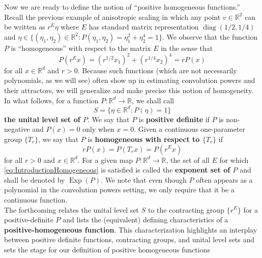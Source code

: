 \documentclass[11pt, letter]{book}
\newcommand\Exp{\operatorname{Exp}}
\newcommand\diag{\operatorname{diag}}
\newcommand{\lp}{\left(}
\newcommand{\rp}{\right)}
\begin{document}
\noindent Now we are ready to define the notion of ``positive homogeneous functions.'' Recall the previous example of anisotropic scaling in which any point $v\in \mathbb{R}^2$ can be written as $r^{E}\eta$ where $E$ has standard matrix representation $\diag(1/2,1/4)$ and $\eta \in \{ (\eta_1,\eta_2) \in \mathbb{R}^2 : P(\eta_1, \eta_2) ={\eta}_1^{2} + {\eta}_2^{4} = 1  \}$. We observe that the function $P$ is ``homogeneous'' with respect to the matrix $E$ in the sense that 
\begin{equation*}
    P(r^{E}x) =  \lp r^{1/2}{x}_1\rp ^{2} + \lp r^{1/4}{x}_2\rp ^{4} = r P(x)
\end{equation*}
for all $x\in \mathbb{R}^d$ and $r>0$. Because such functions (which are not necessarily polynomials, as we will see) often show up in estimating convolution powers and their attractors, we will generalize and make precise this notion of homogeneity. In what follows, for a function $P:\mathbb{R}^d\to\mathbb{R}$, we shall call
\begin{equation*}
    S=\{\eta\in\mathbb{R}^d:P(\eta)=1\}
\end{equation*}
\textbf{the unital level set of $P$}. We say that $P$ is \textbf{positive definite} if $P$ is non-negative and $P(x)=0$ only when $x=0$. Given a continuous one-parameter group $\{T_r\}$, we say that $P$ is \textbf{homogeneous with respect to $\{T_r\}$} if
\begin{equation}\label{eq:IntroductionHomogeneous}
    rP(x)=P(T_r x)=P(r^Ex)
\end{equation}
for all $r>0$ and $x\in\mathbb{R}^d$. For a given map $P:\mathbb{R}^d\to\mathbb{R}$, the set of all $E$ for which \eqref{eq:IntroductionHomogeneous} is satisfied is called the \textbf{exponent set of $P$} and shall be denoted by $\Exp(P)$. We note that even though $P$ often appears as a polynomial in the convolution powers setting, we only require that it be a continuous function. \\



The forthcoming relates the unital level set $S$ to the contracting group $\{r^E\}$ for a positive-definite $P$ and lists the (equivalent) defining characteristics of a \textbf{positive-homogeneous function}. This characterization highlights an interplay between positive definite functions, contracting groups, and unital level sets and sets the stage for our definition of positive homogeneous functions\\
\end{document}
